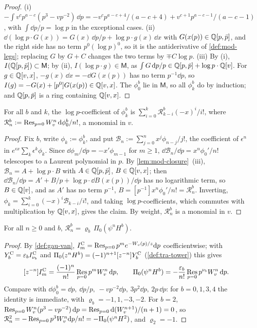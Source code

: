 \begin{proof}
(i) $-\int v^cp^{a-c}(p^3-vp^{-2})\,\dd p=-v^cp^{a-c+4}/(a-c+4)+v^{c+1}p^{a-c-1}/(a-c-1)$, with $\int\dd p/p=\log p$ in the exceptional cases. (ii) $\dd(\log p\cdot G(x))=G(x)\,\dd p/p+\log p\cdot g(x)\,\dd x$ with $G(x(p))\in\mathbb{Q}[p,\bar p]$, and the right side has no term $p^0(\log p)^0$, so it is the antiderivative of \cref{def:mod-legs}; replacing $G$ by $G+C$ changes the two terms by $\mp C\log p$. (iii) By (i), $I(\mathbb{Q}[p,\bar p])\subset\mathsf M$; by (ii), $I(\log p\cdot g)\in\mathsf M$, as $\int G\,\mathrm{d} p/p\in\mathbb{Q}[p,\bar p]+\log p\cdot\mathbb{Q}[v]$. For $g\in\mathbb{Q}[v,x]$, $-g(x)\,\dd x=-\dd G(x(p))$ has no term $p^{-1}\dd p$, so $I(g)=-G(x)+[p^0]G(x(p))\in\mathbb{Q}[v,x]$. The $\phi^b_0$ lie in $\mathsf M$, so all $\phi^b_k$ do by induction; and $\mathbb{Q}[p,\bar p]$ is a ring containing $\mathbb{Q}[v,x]$.
\end{proof}

\begin{lem}
\label{lem:mod-genfn}
For all $b$ and $k$, the $\log p$-coefficient of $\phi^b_k$ is $\sum_{i=0}^k\mathcal R^b_{k-i}(-x)^i/i!$, where $\mathcal R^b_n:=\operatorname*{Res}_{p=0}W_{v}^n\,\mathrm{d}\phi^b_0/n!$, a monomial in $v$.
\end{lem}

\begin{proof}
Fix $b$, write $\phi_k:=\phi^b_k$, and put $\mathcal B_n:=\sum_{j=0}^nx^j\phi_{n-j}/j!$, the coefficient of $\epsilon^n$ in $e^{\epsilon x}\sum_k\epsilon^k\phi_k$. Since $\dd\phi_m/\dd p=-x'\phi_{m-1}$ for $m\geq 1$, $\dd\mathcal B_n/\dd p=x^n\phi_0'/n!$ telescopes to a Laurent polynomial in $p$. By \cref{lem:mod-closure}~(iii), $\mathcal B_n=A+\log p\cdot B$ with $A\in\mathbb{Q}[p,\bar p]$, $B\in\mathbb{Q}[v,x]$; then $\dd\mathcal B_n/\dd p=A'+B/p+\log p\cdot\dd B(x(p))/\dd p$ has no logarithmic term, so $B\in\mathbb{Q}[v]$, and as $A'$ has no term $p^{-1}$, $B=[p^{-1}]x^n\phi_0'/n!=\mathcal R^b_n$. Inverting, $\phi_k=\sum_{i=0}^k(-x)^i\mathcal B_{k-i}/i!$, and taking $\log p$-coefficients, which commutes with multiplication by $\mathbb{Q}[v,x]$, gives the claim. By weight, $\mathcal R^b_n$ is a monomial in $v$.
\end{proof}

\begin{lem}
\label{lem:mod-resid}
For all $n\geq 0$ and $b$, $\mathcal R^b_n=\varrho_b\,\Pi_0(\psi^nH^b)$.
\end{lem}

\begin{proof}
By \cref{def:gau-van}, $I^{\mathrm{C}}_m=\operatorname*{Res}_{p=0}p^me^{-W_{v}(p)/z}\mathrm{d} p$ coefficientwise; with $Y^{\mathrm{C}}_b=\varepsilon_bI^{\mathrm{C}}_{\nu_b}$ and $\Pi_0(z^nH^b)=(-1)^{n+1}[z^{-n}]Y^{\mathrm{C}}_b$ (\cref{def:tra-tower}) this gives
\[
[z^{-n}]I^{\mathrm{C}}_m=\frac{(-1)^n}{n!}\operatorname*{Res}_{p=0}p^mW_{v}^n\,\mathrm{d} p,\qquad \Pi_0(\psi^nH^b)=-\frac{\varepsilon_b}{n!}\operatorname*{Res}_{p=0}p^{\nu_b}W_{v}^n\,\mathrm{d} p .
\]
Compare with $\dd\phi^b_0=\dd p,\ \dd p/p,\ -vp^{-2}\dd p,\ 3p^2\dd p,\ 2p\,\dd p$: for $b=0,1,3,4$ the identity is immediate, with $\varrho_b=-1,1,-3,-2$. For $b=2$, $\operatorname*{Res}_{p=0}W_{v}^n(p^3-vp^{-2})\,\mathrm{d} p=\operatorname*{Res}_{p=0}\mathrm{d}(W_{v}^{n+1})/(n+1)=0$, so $\mathcal R^2_n=-\operatorname*{Res}_{p=0}p^3W_{v}^n\mathrm{d} p/n!=-\Pi_0(\psi^nH^2)$, and $\varrho_2=-1$.
\end{proof}

